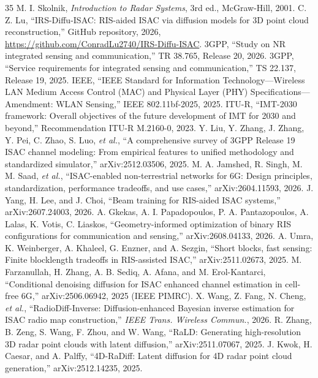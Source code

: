 \documentclass[11pt]{article}
\begin{document}
\begin{thebibliography}{35}
 M. I. Skolnik, \emph{Introduction to Radar Systems}, 3rd ed., McGraw-Hill, 2001.
 C. Z. Lu, ``IRS-Diffu-ISAC: RIS-aided ISAC via diffusion models for 3D point cloud reconstruction,'' GitHub repository, 2026, \url{https://github.com/ConradLu2740/IRS-Diffu-ISAC}.
 3GPP, ``Study on NR integrated sensing and communication,'' TR 38.765, Release 20, 2026.
 3GPP, ``Service requirements for integrated sensing and communication,'' TS 22.137, Release 19, 2025.
 IEEE, ``IEEE Standard for Information Technology---Wireless LAN Medium Access Control (MAC) and Physical Layer (PHY) Specifications---Amendment: WLAN Sensing,'' IEEE 802.11bf-2025, 2025.
 ITU-R, ``IMT-2030 framework: Overall objectives of the future development of IMT for 2030 and beyond,'' Recommendation ITU-R M.2160-0, 2023.
 Y. Liu, Y. Zhang, J. Zhang, Y. Pei, C. Zhao, S. Luo, \emph{et al.}, ``A comprehensive survey of 3GPP Release 19 ISAC channel modeling: From empirical features to unified methodology and standardized simulator,'' arXiv:2512.03506, 2025.
 M. A. Jamshed, R. Singh, M. M. Saad, \emph{et al.}, ``ISAC-enabled non-terrestrial networks for 6G: Design principles, standardization, performance tradeoffs, and use cases,'' arXiv:2604.11593, 2026.
 J. Yang, H. Lee, and J. Choi, ``Beam training for RIS-aided ISAC systems,'' arXiv:2607.24003, 2026.
 A. Gkekas, A. I. Papadopoulos, P. A. Pantazopoulos, A. Lalas, K. Votis, C. Liaskos, ``Geometry-informed optimization of binary RIS configurations for communication and sensing,'' arXiv:2608.04133, 2026.
 A. Umra, K. Weinberger, A. Khaleel, G. Enzner, and A. Sezgin, ``Short blocks, fast sensing: Finite blocklength tradeoffs in RIS-assisted ISAC,'' arXiv:2511.02673, 2025.
 M. Farzanullah, H. Zhang, A. B. Sediq, A. Afana, and M. Erol-Kantarci, ``Conditional denoising diffusion for ISAC enhanced channel estimation in cell-free 6G,'' arXiv:2506.06942, 2025 (IEEE PIMRC).
 X. Wang, Z. Fang, N. Cheng, \emph{et al.}, ``RadioDiff-Inverse: Diffusion-enhanced Bayesian inverse estimation for ISAC radio map construction,'' \emph{IEEE Trans. Wireless Commun.}, 2026.
 R. Zhang, B. Zeng, S. Wang, F. Zhou, and W. Wang, ``RaLD: Generating high-resolution 3D radar point clouds with latent diffusion,'' arXiv:2511.07067, 2025.
 J. Kwok, H. Caesar, and A. Palffy, ``4D-RaDiff: Latent diffusion for 4D radar point cloud generation,'' arXiv:2512.14235, 2025.

\end{thebibliography}
\end{document}
